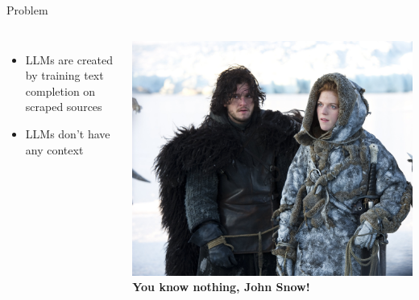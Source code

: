 \documentclass[aspectratio=169]{beamer}
\begin{document}
\begin{frame}[fragile]{Problem}
\begin{columns}
\begin{itemize}
  \item LLMs are created by training text completion on scraped sources
  \item LLMs don't have any context
\end{itemize}
  \includegraphics[width=\linewidth]{JohnSnow}
\textbf{You know nothing, John Snow!} 
\end{columns}
\end{frame}
\end{document}
